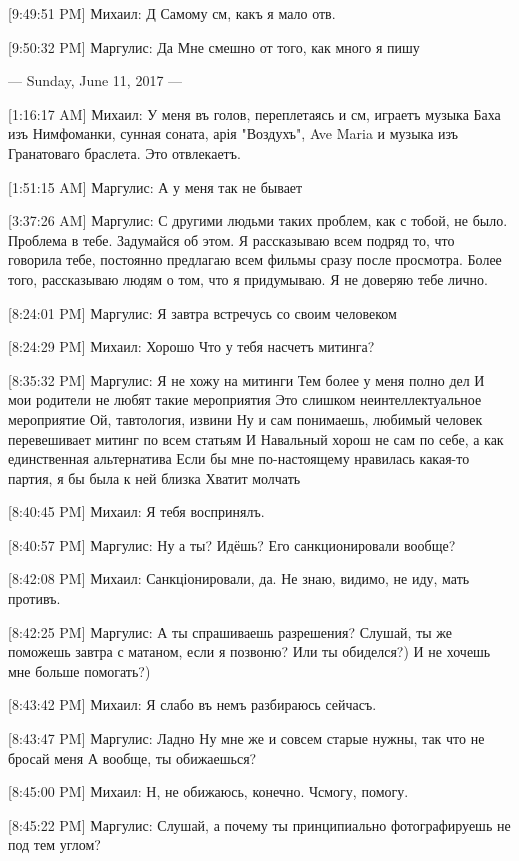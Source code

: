 \documentclass{article}
\newcommand{\yat}{{\fontencoding{X2}\selectfont\cyryat}} %
\begin{document}
[9:49:51 PM] Михаил:
Д
 Самому см, какъ я мало отв.

[9:50:32 PM] Маргулис:
Да
 Мне смешно от того, как много я пишу

--- Sunday, June 11, 2017 ---

[1:16:17 AM] Михаил:
У меня въ голов\yat, переплетаясь и см, играетъ музыка Баха изъ Нимфоманки, сунная соната, арія "Воздухъ", Ave Maria и музыка изъ Гранатоваго браслета. Это отвлекаетъ.

[1:51:15 AM] Маргулис:
А у меня так не бывает

[3:37:26 AM] Маргулис:
С другими людьми таких проблем, как с тобой, не было. Проблема в тебе. Задумайся об этом. Я рассказываю всем подряд то, что говорила тебе, постоянно предлагаю всем фильмы сразу после просмотра. Более того, рассказываю людям о том, что я придумываю. Я не доверяю тебе лично.

[8:24:01 PM] Маргулис:
Я завтра встречусь со своим человеком

[8:24:29 PM] Михаил:
Хорошо
 Что у тебя насчетъ митинга?

[8:35:32 PM] Маргулис:
Я не хожу на митинги
 Тем более у меня полно дел
 И мои родители не любят такие мероприятия
 Это слишком неинтеллектуальное мероприятие
 Ой, тавтология, извини
 Ну и сам понимаешь, любимый человек перевешивает митинг по всем статьям
 И Навальный хорош не сам по себе, а как единственная альтернатива
 Если бы мне по-настоящему нравилась какая-то партия, я бы была к ней близка
 Хватит молчать

[8:40:45 PM] Михаил:
Я тебя воспринялъ.

[8:40:57 PM] Маргулис:
Ну а ты?
 Идёшь?
 Его санкционировали вообще?

[8:42:08 PM] Михаил:
Санкціонировали, да. Не знаю, видимо, не иду, мать противъ.

[8:42:25 PM] Маргулис:
А ты спрашиваешь разрешения?
 Слушай, ты же поможешь завтра с матаном, если я позвоню?
 Или ты обиделся?)
 И не хочешь мне больше помогать?)

[8:43:42 PM] Михаил:
Я слабо въ немъ разбираюсь сейчасъ.

[8:43:47 PM] Маргулис:
Ладно
 Ну мне же и совсем старые нужны, так что не бросай меня
 А вообще, ты обижаешься?

[8:45:00 PM] Михаил:
Н, не обижаюсь, конечно. Ч смогу, помогу.

[8:45:22 PM] Маргулис:
Слушай, а почему ты принципиально фотографируешь не под тем углом?
\end{document}
